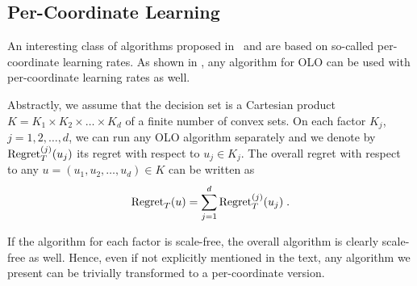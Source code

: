 \subsection{Per-Coordinate Learning}
\label{sec:per-coordinate}

An interesting class of algorithms proposed in~\cite{McMahan-Streeter-2010} and
\cite{Duchi-Hazan-Singer-2011} are based on so-called per-coordinate
learning rates.  As shown in \cite{Streeter-McMahan-2010}, any algorithm for
OLO can be used with per-coordinate learning rates as well.

Abstractly, we assume that the decision set is a Cartesian product $K=K_1
\times K_2 \times \dots \times K_d$ of a finite number of convex sets.  On each
factor $K_j$, $j=1,2,\dots,d$, we can run any OLO algorithm separately and we
denote by $\operatorname{Regret}_T^{(j)}(u_j)$ its regret with respect to $u_j \in K_j$. The
overall regret with respect to any $u=(u_1, u_2, \dots, u_d) \in K$ can be
written as
$$
\operatorname{Regret}_T(u) = \sum_{j=1}^d \operatorname{Regret}_T^{(j)}(u_j) \; .
$$

If the algorithm for each factor is scale-free, the overall algorithm is
clearly scale-free as well. Hence, even if not explicitly mentioned in the
text, any algorithm we present can be trivially transformed to a per-coordinate
version.
